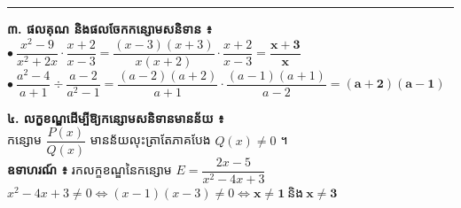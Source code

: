 \documentclass[theme=teal]{khmermath}
\newenvironment{khcard}{%
  \par\vspace{1.5pt}\noindent%
  \begin{tcolorbox}[
    enhanced,
    colback=koreaBeige,
    colframe=cardBorder,
    arc=4pt,
    boxrule=0.6pt,
    left=5pt, right=5pt, top=3pt, bottom=3pt
  ]%
}{\end{tcolorbox}\par\vspace{1.5pt}}
\begin{document}
\begin{khcard}
  \vspace{2pt}\hrule\vspace{2pt}
  \noindent
  \begin{minipage}[t]{0.54\textwidth}
    \textbf{៣. ផលគុណ និងផលចែកកន្សោមសនិទាន ៖}\\[1.5pt]
    $\bullet\ \dfrac{x^2 - 9}{x^2 + 2x} \cdot \dfrac{x+2}{x-3} = \dfrac{(x-3)(x+3)}{x(x+2)} \cdot \dfrac{x+2}{x-3} = \mathbf{\dfrac{x+3}{x}}$\\[2.5pt]
    $\bullet\ \dfrac{a^2 - 4}{a+1} \div \dfrac{a-2}{a^2 - 1} = \dfrac{(a-2)(a+2)}{a+1} \cdot \dfrac{(a-1)(a+1)}{a-2} = \mathbf{(a+2)(a-1)}$
  \end{minipage}\hfill
  \begin{minipage}[t]{0.44\textwidth}
    \textbf{៤. លក្ខខណ្ឌដើម្បីឱ្យកន្សោមសនិទានមានន័យ ៖}\\[1.5pt]
    កន្សោម $\dfrac{P(x)}{Q(x)}$ មានន័យលុះត្រាតែភាគបែង $Q(x) \neq 0$ ។\\[2pt]
    \textbf{ឧទាហរណ៍ ៖} រកលក្ខខណ្ឌនៃកន្សោម $E = \dfrac{2x - 5}{x^2 - 4x + 3}$\\[1.5pt]
    $x^2 - 4x + 3 \neq 0 \iff (x - 1)(x - 3) \neq 0 \iff \mathbf{x \neq 1 \ \text{និង}\ x \neq 3}$
  \end{minipage}
\end{khcard}

\clearpage
\end{document}
